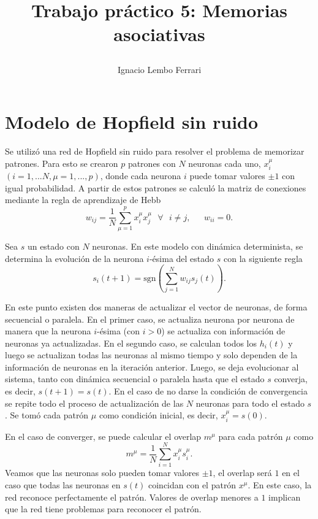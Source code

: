 \documentclass[11pt,twocolumn,twoside]{opticajnl}
\title{
\vspace{0.1cm} 

Trabajo práctico 5: Memorias asociativas}
\author[1]{\huge{Ignacio Lembo Ferrari}}
\affil[1]{\large{ignaciolembo@ib.edu.ar} 

\vspace{0.1cm}

{\datesfont 17 de noviembre del 2023.}

\vspace{0.1cm}
}
\begin{document}
\maketitle

\section{Modelo de Hopfield sin ruido \label{sec:ej1}}

\vspace{0.3cm}

Se utilizó una red de Hopfield sin ruido para resolver el problema de memorizar patrones. Para esto se crearon $p$ patrones con $N$ neuronas cada uno, $x_i^\mu$ $(i = 1,... N, \mu= 1,...,p)$, donde cada neurona $i$ puede tomar valores $\pm 1$ con igual probabilidad. A partir de estos patrones se calculó la matriz de conexiones mediante la regla de aprendizaje de Hebb
\begin{equation}
    w_{ij} = \frac{1}{N} \sum_{\mu=1}^p x_i^\mu x_j^\mu ~~~\forall ~~~ i \neq j, ~~~~~~~ w_{ii} = 0.
\end{equation}

Sea $s$ un estado con $N$ neuronas. En este modelo con dinámica determinista, se determina la evolución de la neurona $i$-ésima del estado $s$ con la siguiente regla
\begin{equation}
    s_i(t + 1) = \text{sgn} \left( \sum_{j=1}^N w_{ij} s_j(t) \right).
\end{equation}


En este punto existen dos maneras de actualizar el vector de neuronas, de forma secuencial o paralela. En el primer caso, se actualiza neurona por neurona de manera que la neurona $i$-ésima (con $i>0$) se actualiza con información de neuronas ya actualizadas. En el segundo caso, se calculan todos los $h_i(t)$ y luego se actualizan todas las neuronas al mismo tiempo y solo dependen de la información de neuronas en la iteración anterior. 
Luego, se deja evolucionar al sistema, tanto con dinámica secuencial o paralela hasta que el estado $s$ converja, es decir, $s(t+1) = s(t)$. En el caso de no darse la condición de convergencia se repite todo el proceso de actualización de las $N$ neuronas para todo el estado $s$. Se tomó cada patrón $\mu$ como condición inicial, es decir, $x_i^\mu = s(0)$.

En el caso de converger, se puede calcular el overlap $m^\mu$ para cada patrón $\mu$ como  
\begin{equation}
    m^\mu = \frac{1}{N} \sum_{i=1}^N x_i^\mu s_i^\mu.
\end{equation}
Veamos que las neuronas solo pueden tomar valores $\pm 1$, el overlap será $1$ en el caso que todas las neuronas en $s(t)$ coincidan con el patrón $x^\mu$. En este caso, la red reconoce perfectamente el patrón. Valores de overlap menores a $1$ implican que la red tiene problemas para reconocer el patrón. 
\end{document}
